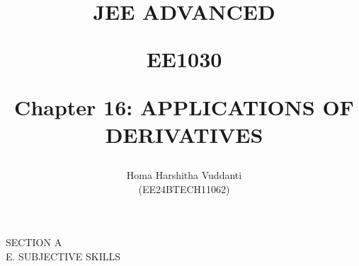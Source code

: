 \documentclass[journal]{IEEEtran}
\begin{document}


\title{
JEE ADVANCED

\large{EE1030}

Chapter 16: APPLICATIONS OF DERIVATIVES
}
\author{Homa Harshitha Vuddanti

(EE24BTECH11062)
}	

\maketitle

\bigskip

\renewcommand{\thefigure}{\theenumi}
\renewcommand{\thetable}{\theenumi}

SECTION A\\

E. SUBJECTIVE SKILLS
\end{document}
